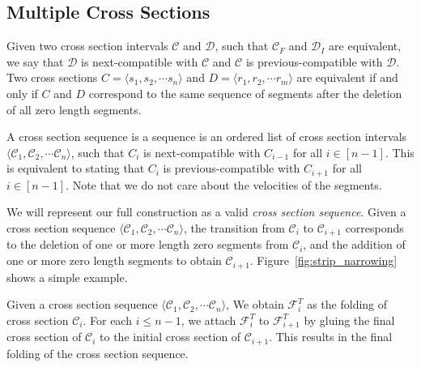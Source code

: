 \subsection{Multiple Cross Sections}
\label{sec:intervals}

\begin{definition}
\label{def:compatible}
Given two cross section intervals $\mathcal C$ and $\mathcal D$, such that $\mathcal C_F$ and $\mathcal D_I$ are equivalent,
we say that $\mathcal D$ is next-compatible with $\mathcal C$ and $\mathcal C$ is previous-compatible with $\mathcal D$.
Two cross sections $C = \langle s_1, s_2,\cdots s_n \rangle$ and $D = \langle r_1, r_2,\cdots r_m \rangle$ are equivalent
if and only if $C$ and $D$ correspond to the same sequence of segments after the deletion of all zero length segments.
\end{definition}

\begin{definition}
\label{def:cross_section_sequence}
A cross section sequence is a sequence is an ordered list of cross section intervals
$ \langle \mathcal C_1, \mathcal C_2,\cdots \mathcal C_n \rangle$,
such that $C_{i}$ is next-compatible with $C_{i-1}$ for all $i\in [n-1]$.
This is equivalent to stating that $C_{i}$ is previous-compatible with $C_{i+1}$ for all $i\in [n-1]$.
Note that we do not care about the velocities of the segments.
\end{definition}

We will represent our full construction as a valid \emph{cross section sequence}.
Given a cross section sequence $\langle \mathcal C_1, \mathcal C_2,\cdots \mathcal C_n \rangle$,
the transition from $\mathcal C_i$ to $\mathcal C_{i+1}$ corresponds to the deletion of one or more
length zero segments from $\mathcal C_i$, and the addition of one or more zero length segments to obtain $\mathcal C_{i+1}$.
Figure~\ref{fig:strip_narrowing} shows a simple example.


\begin{definition}
\label{def:sequence_folding}
Given a cross section sequence $\langle \mathcal C_1, \mathcal C_2,\cdots \mathcal C_n \rangle$,
We obtain $\mathcal F_i^T$ as the folding of cross section $\mathcal C_i$.
For each $i\le n-1$, we attach $\mathcal F_i^T$ to $\mathcal F_{i+1}^T$ by gluing
the final cross section of $\mathcal C_i$ to the initial cross section of $\mathcal C_{i+1}$.
This results in the final folding of the cross section sequence.
\end{definition}

